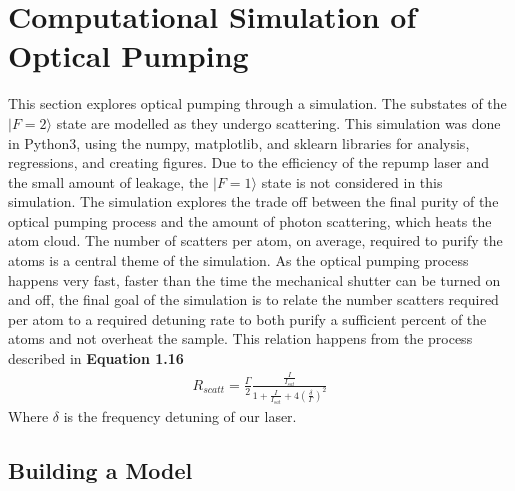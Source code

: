 \chapter{Computational Simulation of Optical Pumping}
This section explores optical pumping through a simulation. The substates of the $|F=2\rangle$ state are modelled as they undergo scattering. This simulation was done in Python3, using the numpy, matplotlib, and sklearn libraries for analysis, regressions, and creating figures. Due to the efficiency of the repump laser and the small amount of leakage, the $|F=1\rangle$ state is not considered in this simulation. The simulation explores the trade off between the final purity of the optical pumping process and the amount of photon scattering, which heats the atom cloud. The number of scatters per atom, on average, required to purify the atoms is a central theme of the simulation. As the optical pumping process happens very fast, faster than the time the mechanical shutter can be turned on and off, the final goal of the simulation is to relate the number scatters required per atom to a required detuning rate to both purify a sufficient percent of the atoms and not overheat the sample. This relation happens from the process described in \textbf{Equation 1.16}
\begin{align*}
R_{scatt} = \frac{\Gamma}{2} \frac{\frac{I}{I_{sat}}}{1 + \frac{I}{I_{sat}} + 4 \left( \frac{\delta}{\Gamma}\right)^2 } \tag{1.16}
\end{align*}
Where $\delta$ is the frequency detuning of our laser. 

\section{Building a Model}

